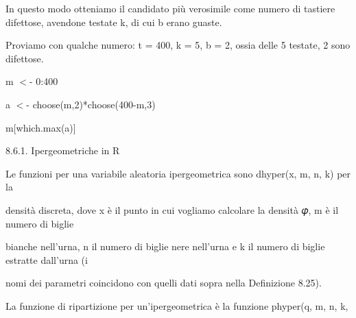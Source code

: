 \documentclass[a4paper,portrait,12pt]{article}
\begin{document}
\begin{flushleft}
In questo modo otteniamo il candidato più verosimile come numero di tastiere difettose, avendone testate k, di cui b erano guaste.
\end{flushleft}


\begin{flushleft}
Proviamo con qualche numero: t = 400, k = 5, b = 2, ossia delle 5 testate, 2 sono difettose.
\end{flushleft}





\begin{flushleft}
m $<$- 0:400
\end{flushleft}


\begin{flushleft}
a $<$- choose(m,2)*choose(400-m,3)
\end{flushleft}


\begin{flushleft}
m[which.max(a)]
\end{flushleft}





\begin{flushleft}
8.6.1. Ipergeometriche in R
\end{flushleft}


\begin{flushleft}
Le funzioni per una variabile aleatoria ipergeometrica sono dhyper(x, m, n, k) per la
\end{flushleft}


\begin{flushleft}
densit\`{a} discreta, dove x \`{e} il punto in cui vogliamo calcolare la densit\`{a} 𝜑, m \`{e} il numero di biglie
\end{flushleft}


\begin{flushleft}
bianche nell'urna, n il numero di biglie nere nell'urna e k il numero di biglie estratte dall'urna (i
\end{flushleft}


\begin{flushleft}
nomi dei parametri coincidono con quelli dati sopra nella Definizione 8.25).
\end{flushleft}


\begin{flushleft}
La funzione di ripartizione per un'ipergeometrica \`{e} la funzione phyper(q, m, n, k,
\end{flushleft}
\end{document}
